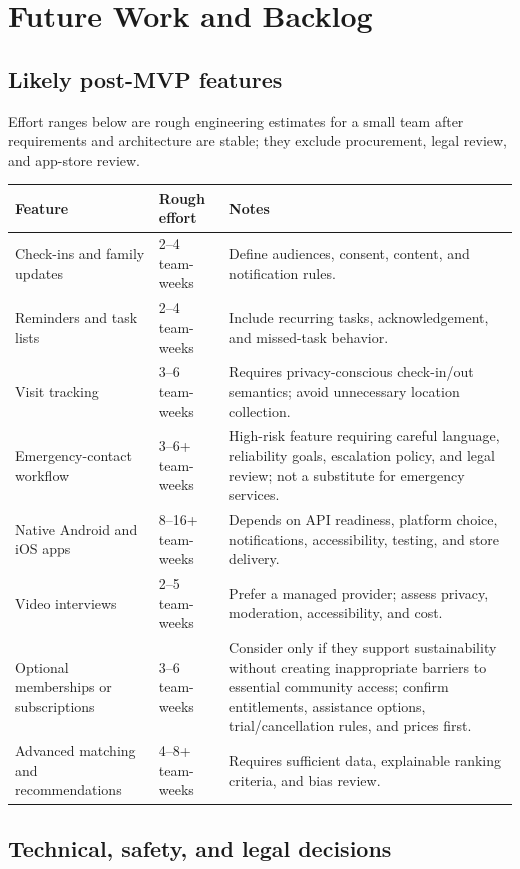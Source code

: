 \documentclass[11pt]{article}
\begin{document}
\section{Future Work and Backlog}

\subsection{Likely post-MVP features}

Effort ranges below are rough engineering estimates for a small team after requirements and architecture are stable; they exclude procurement, legal review, and app-store review.

\begin{tabularx}{\textwidth}{X p{} X}
\toprule
\textbf{Feature} & \textbf{Rough effort} & \textbf{Notes} \\
\midrule
Check-ins and family updates & 2--4 team-weeks & Define audiences, consent, content, and notification rules. \\
Reminders and task lists & 2--4 team-weeks & Include recurring tasks, acknowledgement, and missed-task behavior. \\
Visit tracking & 3--6 team-weeks & Requires privacy-conscious check-in/out semantics; avoid unnecessary location collection. \\
Emergency-contact workflow & 3--6+ team-weeks & High-risk feature requiring careful language, reliability goals, escalation policy, and legal review; not a substitute for emergency services. \\
Native Android and iOS apps & 8--16+ team-weeks & Depends on API readiness, platform choice, notifications, accessibility, testing, and store delivery. \\
Video interviews & 2--5 team-weeks & Prefer a managed provider; assess privacy, moderation, accessibility, and cost. \\
Optional memberships or subscriptions & 3--6 team-weeks & Consider only if they support sustainability without creating inappropriate barriers to essential community access; confirm entitlements, assistance options, trial/cancellation rules, and prices first. \\
Advanced matching and recommendations & 4--8+ team-weeks & Requires sufficient data, explainable ranking criteria, and bias review. \\
\bottomrule
\end{tabularx}

\subsection{Technical, safety, and legal decisions}
\end{document}
